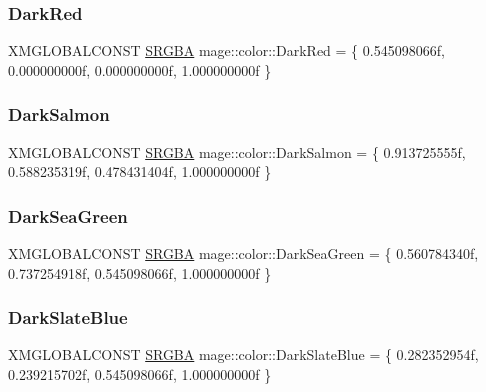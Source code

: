 \hypertarget{namespacemage_1_1color_a0b39625542054fdccde9987b40d9de76}{}\label{namespacemage_1_1color_a0b39625542054fdccde9987b40d9de76} 
\subsubsection{\texorpdfstring{Dark\+Red}{DarkRed}}
{\footnotesize\ttfamily X\+M\+G\+L\+O\+B\+A\+L\+C\+O\+N\+ST \hyperlink{structmage_1_1_s_r_g_b_a}{S\+R\+G\+BA} mage\+::color\+::\+Dark\+Red = \{ 0.\+545098066f, 0.\+000000000f, 0.\+000000000f, 1.\+000000000f \}}

\hypertarget{namespacemage_1_1color_a152f961783386c7d35cb945ac89026bd}{}\label{namespacemage_1_1color_a152f961783386c7d35cb945ac89026bd} 
\subsubsection{\texorpdfstring{Dark\+Salmon}{DarkSalmon}}
{\footnotesize\ttfamily X\+M\+G\+L\+O\+B\+A\+L\+C\+O\+N\+ST \hyperlink{structmage_1_1_s_r_g_b_a}{S\+R\+G\+BA} mage\+::color\+::\+Dark\+Salmon = \{ 0.\+913725555f, 0.\+588235319f, 0.\+478431404f, 1.\+000000000f \}}

\hypertarget{namespacemage_1_1color_a86d3cd5e64a2e34ba14b9ca697e12b5a}{}\label{namespacemage_1_1color_a86d3cd5e64a2e34ba14b9ca697e12b5a} 
\subsubsection{\texorpdfstring{Dark\+Sea\+Green}{DarkSeaGreen}}
{\footnotesize\ttfamily X\+M\+G\+L\+O\+B\+A\+L\+C\+O\+N\+ST \hyperlink{structmage_1_1_s_r_g_b_a}{S\+R\+G\+BA} mage\+::color\+::\+Dark\+Sea\+Green = \{ 0.\+560784340f, 0.\+737254918f, 0.\+545098066f, 1.\+000000000f \}}

\hypertarget{namespacemage_1_1color_adb9fec6b7ccf429dedf44e35a47a82da}{}\label{namespacemage_1_1color_adb9fec6b7ccf429dedf44e35a47a82da} 
\subsubsection{\texorpdfstring{Dark\+Slate\+Blue}{DarkSlateBlue}}
{\footnotesize\ttfamily X\+M\+G\+L\+O\+B\+A\+L\+C\+O\+N\+ST \hyperlink{structmage_1_1_s_r_g_b_a}{S\+R\+G\+BA} mage\+::color\+::\+Dark\+Slate\+Blue = \{ 0.\+282352954f, 0.\+239215702f, 0.\+545098066f, 1.\+000000000f \}}


